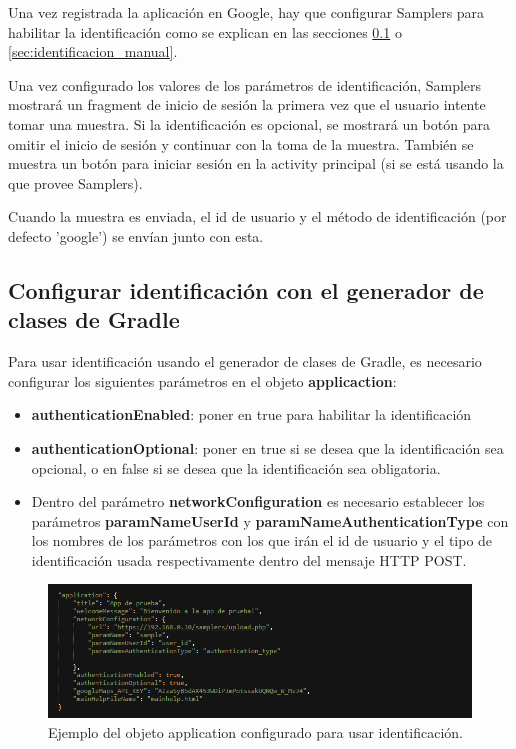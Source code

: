 Una vez registrada la aplicación en Google, hay que configurar Samplers para habilitar la identificación como se explican en las secciones \ref{sec:identificacion_gradle} o \ref{sec:identificacion_manual}.

Una vez configurado los valores de los parámetros de identificación, Samplers mostrará un fragment de inicio de sesión la primera vez que el usuario intente tomar una muestra. Si la identificación es opcional, se mostrará un botón para omitir el inicio de sesión y continuar con la toma de la muestra. También se muestra un botón para iniciar sesión en la activity principal (si se está usando la que provee Samplers).

Cuando la muestra es enviada, el id de usuario y el método de identificación (por defecto 'google') se envían junto con esta.


\subsection{Configurar identificación con el generador de clases de Gradle} \label{sec:identificacion_gradle}

Para usar identificación usando el generador de clases de Gradle, es necesario configurar los siguientes parámetros en el objeto \textbf{applicaction}:

\begin{itemize}

	\item \textbf{authenticationEnabled}: poner en true para habilitar la identificación
		
	\item \textbf{authenticationOptional}: poner en true si se desea que la identificación sea opcional, o en false si se desea que la identificación sea obligatoria.
	
	\item Dentro del parámetro \textbf{networkConfiguration} es necesario establecer los parámetros \textbf{paramNameUserId} y \textbf{paramNameAuthenticationType} con los nombres de los parámetros con los que irán el id de usuario y el tipo de identificación usada respectivamente dentro del mensaje HTTP POST.
	

\end{itemize}

\begin{figure}[H]
  \centering
    \includegraphics[scale=0.6]{50-anexos/B-uso/identificacion.png} 
    \caption{Ejemplo del objeto application configurado para usar identificación.}
\end{figure}	


